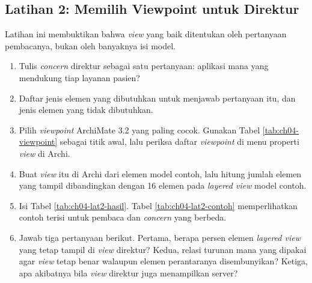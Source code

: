 \subsection*{Latihan 2: Memilih Viewpoint untuk Direktur}

Latihan ini membuktikan bahwa \textit{view} yang baik ditentukan oleh
pertanyaan pembacanya, bukan oleh banyaknya isi model.

\begin{enumerate}
  \item Tulis \textit{concern} direktur sebagai satu pertanyaan: aplikasi mana
        yang mendukung tiap layanan pasien?
  \item Daftar jenis elemen yang dibutuhkan untuk menjawab pertanyaan itu, dan
        jenis elemen yang tidak dibutuhkan.
  \item Pilih \textit{viewpoint} ArchiMate 3.2 yang paling cocok. Gunakan
        Tabel \ref{tab:ch04-viewpoint} sebagai titik awal, lalu periksa daftar
        \textit{viewpoint} di menu properti \textit{view} di Archi.
  \item Buat \textit{view} itu di Archi dari elemen model contoh, lalu hitung
        jumlah elemen yang tampil dibandingkan dengan 16 elemen pada
        \textit{layered view} model contoh.
  \item Isi Tabel \ref{tab:ch04-lat2-hasil}. Tabel \ref{tab:ch04-lat2-contoh}
        memperlihatkan contoh terisi untuk pembaca dan \textit{concern} yang
        berbeda.
  \item Jawab tiga pertanyaan berikut. Pertama, berapa persen elemen
        \textit{layered view} yang tetap tampil di \textit{view} direktur?
        Kedua, relasi turunan mana yang dipakai agar \textit{view} tetap benar
        walaupun elemen perantaranya disembunyikan? Ketiga, apa akibatnya bila
        \textit{view} direktur juga menampilkan server?
\end{enumerate}

